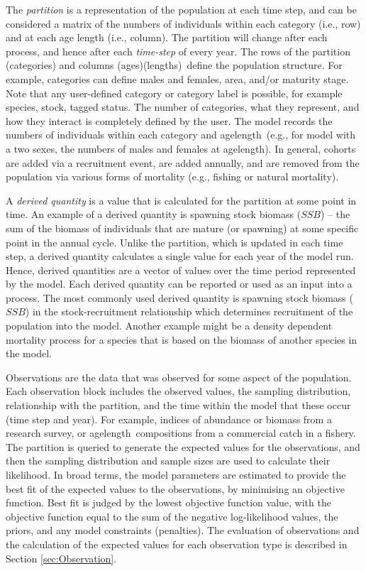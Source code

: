 The \emph{partition} is a representation of the population at each time step, and can be considered a matrix of the numbers of individuals within each category (i.e., row) and at each \ifAgeBased age \else length \fi (i.e., column). The partition will change after each process, and hence after each \emph{time-step} of every year. The rows of the partition (categories) and columns \ifAgeBased(ages)\else(lengths)\fi \ define the population structure. For example, categories can define males and females, area, and/or maturity stage. Note that any user-defined category or category label is possible, for example species, stock, tagged status. The number of categories, what they represent, and how they interact is completely defined by the user. The model records the numbers of individuals within each category and \ifAgeBased age\else length\fi \  (e.g., for model with a two sexes, the numbers of males and females at \ifAgeBased age\else length\fi ). In general, cohorts are added via a recruitment event, are added annually, and are removed from the population via various forms of mortality (e.g., fishing or natural mortality).

A \emph{derived quantity} is a value that is calculated for the partition at some point in time. An example of a derived quantity is spawning stock biomass ($SSB$) -- the sum of the biomass of individuals that are mature (or spawning) at some specific point in the annual cycle. Unlike the partition, which is updated in each time step, a derived quantity calculates a single value for each year of the model run. Hence, derived quantities are a vector of values over the time period represented by the model. Each derived quantity can be reported or used as an input into a process. The most commonly used derived quantity is spawning stock biomass ($SSB$) in the stock-recruitment relationship which determines recruitment of the population into the model. Another example might be a density dependent mortality process for a species that is based on the biomass of another species in the model.

Observations are the data that was observed for some aspect of the population. Each observation block includes the observed values, the sampling distribution, relationship with the partition, and the time within the model that these occur (time step and year). For example, indices of abundance or biomass from a research survey, or \ifAgeBased age\else length\fi \ compositions from a commercial catch in a fishery. The partition is queried to generate the expected values for the observations, and then the sampling distribution and sample sizes are used to calculate their likelihood. In broad terms, the model parameters are estimated to provide the best fit of the expected values to the observations, by minimising an objective function. Best fit is judged by the lowest objective function value, with the objective function equal to the sum of the negative log-likelihood values, the priors, and any model constraints (penalties). The evaluation of observations and the calculation of the expected values for each observation type is described in Section \ref{sec:Observation}.

